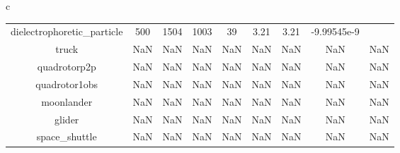 \documentclass{standalone}
\begin{document}
\begin{tabular}{c}
\begin{tabular}{ccccccccc}
  dielectrophoretic\_particle & 500 & 1504 & 1003 & 39 & 3.21 & 3.21 & -9.99545e-9 & \color{red}{Infeasible Problem} \\
  truck & NaN & NaN & NaN & NaN & NaN & NaN & NaN & NaN \\
  quadrotorp2p & NaN & NaN & NaN & NaN & NaN & NaN & NaN & NaN \\
  quadrotor1obs & NaN & NaN & NaN & NaN & NaN & NaN & NaN & NaN \\
  moonlander & NaN & NaN & NaN & NaN & NaN & NaN & NaN & NaN \\
  glider & NaN & NaN & NaN & NaN & NaN & NaN & NaN & NaN \\
  space\_shuttle & NaN & NaN & NaN & NaN & NaN & NaN & NaN & NaN \\\hline
\end{tabular}
\end{tabular}
\end{document}
